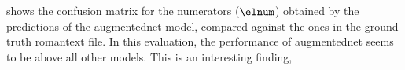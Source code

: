 

 shows the
confusion matrix for the numerators ($\elnum$) obtained by
the predictions of the \gls{augmentednet} model, compared
against the ones in the ground truth \gls{romantext} file.
In this evaluation, the performance of \gls{augmentednet}
seems to be above all other models. This is an interesting
finding, 


